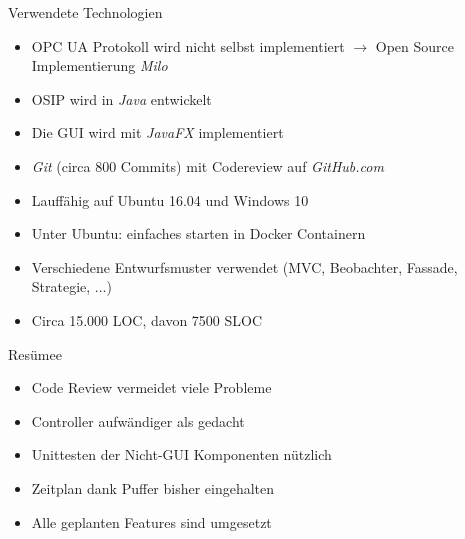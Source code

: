 \documentclass[22pt]{beamer}
\begin{document}
\begin{frame}{Verwendete Technologien}
\begin{itemize}[<+->]
 \item OPC UA Protokoll wird nicht selbst implementiert $\rightarrow$ Open Source Implementierung \emph{Milo}
 \item OSIP wird in \emph{Java} entwickelt
 \item Die GUI wird mit \emph{JavaFX} implementiert
 \item \emph{Git} (circa 800 Commits) mit Codereview auf \emph{GitHub.com}
 \item Lauffähig auf Ubuntu 16.04 und Windows 10
 \item Unter Ubuntu: einfaches starten in Docker Containern
 \item Verschiedene Entwurfsmuster verwendet (MVC, Beobachter, Fassade, Strategie, ...)
 \item Circa 15.000 LOC, davon 7500 SLOC
\end{itemize}
\end{frame}

\begin{frame}{Resümee}
\begin{itemize}[<+->]
 \item Code Review vermeidet viele Probleme
 \item Controller aufwändiger als gedacht
 \item Unittesten der Nicht-GUI Komponenten nützlich
 \item Zeitplan dank Puffer bisher eingehalten
 \item Alle geplanten Features sind umgesetzt
\end{itemize}
\end{frame}
\end{document}
